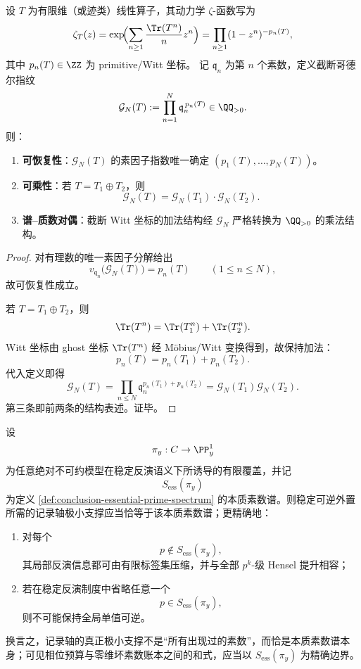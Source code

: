 \begin{proposition}\label{prop:conclusion-bigwitt-godel-multiplicative}
设 \(T\) 为有限维（或迹类）线性算子，其动力学 \(\zeta\)-函数写为
\[
\zeta_T(z)
=\exp\!\Bigl(\sum_{n\ge 1}\frac{\Tr(T^n)}{n}z^n\Bigr)
=\prod_{n\ge 1}(1-z^n)^{-p_n(T)},
\]
其中 \(p_n(T)\in\ZZ\) 为 primitive/Witt 坐标。
记 \(\mathfrak q_n\) 为第 \(n\) 个素数，定义截断哥德尔指纹
\[
\mathcal G_N(T):=\prod_{n=1}^{N}\mathfrak q_n^{\,p_n(T)}\in\QQ_{>0}.
\]
则：
\begin{enumerate}
  \item \textbf{可恢复性}：\(\mathcal G_N(T)\) 的素因子指数唯一确定
  \((p_1(T),\dots,p_N(T))\)。
  \item \textbf{可乘性}：若 \(T=T_1\oplus T_2\)，则
  \[
  \mathcal G_N(T)=\mathcal G_N(T_1)\cdot \mathcal G_N(T_2).
  \]
  \item \textbf{谱--质数对偶}：截断 Witt 坐标的加法结构经 \(\mathcal G_N\) 严格转换为 \(\QQ_{>0}\) 的乘法结构。
\end{enumerate}
\end{proposition}
\begin{proof}
对有理数的唯一素因子分解给出
\[
v_{\mathfrak q_n}\!\bigl(\mathcal G_N(T)\bigr)=p_n(T)\qquad(1\le n\le N),
\]
故可恢复性成立。

若 \(T=T_1\oplus T_2\)，则
\[
\Tr(T^n)=\Tr(T_1^n)+\Tr(T_2^n).
\]
Witt 坐标由 ghost 坐标 \(\Tr(T^n)\) 经 Möbius/Witt 变换得到，故保持加法：
\[
p_n(T)=p_n(T_1)+p_n(T_2).
\]
代入定义即得
\[
\mathcal G_N(T)
=\prod_{n\le N}\mathfrak q_n^{p_n(T_1)+p_n(T_2)}
=\mathcal G_N(T_1)\mathcal G_N(T_2).
\]
第三条即前两条的结构表述。证毕。
\end{proof}



\begin{conjecture}[本质素数谱给出记录轴的精确最小支撑]\label{conj:conclusion-essential-prime-spectrum-exact-minimal-support}
设
\[
\pi_y:C\to\PP^1_y
\]
为任意绝对不可约模型在稳定反演语义下所诱导的有限覆盖，并记
\[
S_{\mathrm{ess}}(\pi_y)
\]
为定义 \ref{def:conclusion-essential-prime-spectrum} 的本质素数谱。则稳定可逆外置所需的记录轴极小支撑应当恰等于该本质素数谱；更精确地：
\begin{enumerate}
  \item 对每个
  \[
  p\notin S_{\mathrm{ess}}(\pi_y),
  \]
  其局部反演信息都可由有限标签集压缩，并与全部 \(p^k\)-级 Hensel 提升相容；
  \item 若在稳定反演制度中省略任意一个
  \[
  p\in S_{\mathrm{ess}}(\pi_y),
  \]
  则不可能保持全局单值可逆。
\end{enumerate}
换言之，记录轴的真正极小支撑不是“所有出现过的素数”，而恰是本质素数谱本身；可见相位预算与零维坏素数账本之间的和式，应当以 \(S_{\mathrm{ess}}(\pi_y)\) 为精确边界。
\end{conjecture}

